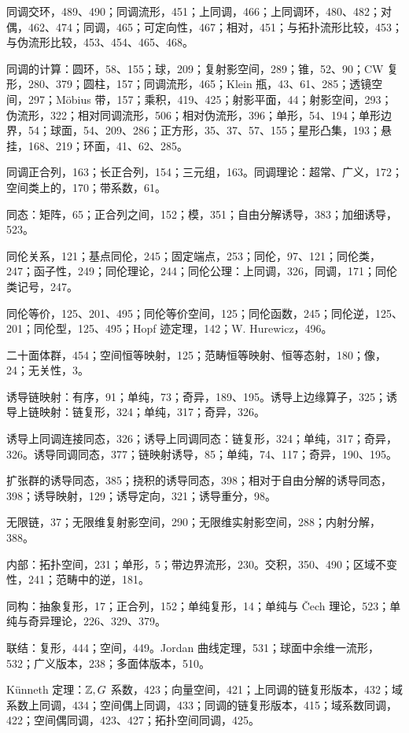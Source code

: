 同调交环，489、490；同调流形，451；上同调，466；上同调环，480、482；对偶，462、474；同调，465；可定向性，467；相对，451；与拓扑流形比较，453；与伪流形比较，453、454、465、468。

同调的计算：圆环，58、155；球，209；复射影空间，289；锥，52、90；CW 复形，280、379；圆柱，157；同调流形，465；Klein 瓶，43、61、285；透镜空间，297；Möbius 带，157；乘积，419、425；射影平面，44；射影空间，293；伪流形，322；相对同调流形，506；相对伪流形，396；单形，54、194；单形边界，54；球面，54、209、286；正方形，35、37、57、155；星形凸集，193；悬挂，168、219；环面，41、62、285。

同调正合列，163；长正合列，154；三元组，163。同调理论：超常、广义，172；空间类上的，170；带系数，61。

同态：矩阵，65；正合列之间，152；模，351；自由分解诱导，383；加细诱导，523。

同伦关系，121；基点同伦，245；固定端点，253；同伦，97、121；同伦类，247；函子性，249；同伦理论，244；同伦公理：上同调，326，同调，171；同伦类记号，247。

同伦等价，125、201、495；同伦等价空间，125；同伦函数，245；同伦逆，125、201；同伦型，125、495；Hopf 迹定理，142；W. Hurewicz，496。

二十面体群，454；空间恒等映射，125；范畴恒等映射、恒等态射，180；像，24；无关性，3。

诱导链映射：有序，91；单纯，73；奇异，189、195。诱导上边缘算子，325；诱导上链映射：链复形，324；单纯，317；奇异，326。

诱导上同调连接同态，326；诱导上同调同态：链复形，324；单纯，317；奇异，326。诱导同调同态，377；链映射诱导，85；单纯，74、117；奇异，190、195。

扩张群的诱导同态，385；挠积的诱导同态，398；相对于自由分解的诱导同态，398；诱导映射，129；诱导定向，321；诱导重分，98。

无限链，37；无限维复射影空间，290；无限维实射影空间，288；内射分解，388。

内部：拓扑空间，231；单形，5；带边界流形，230。交积，350、490；区域不变性，241；范畴中的逆，181。

同构：抽象复形，17；正合列，152；单纯复形，14；单纯与 Čech 理论，523；单纯与奇异理论，226、329、379。

联结：复形，444；空间，449。Jordan 曲线定理，531；球面中余维一流形，532；广义版本，238；多面体版本，510。

Künneth 定理：$\mathbb{Z},G$ 系数，423；向量空间，421；上同调的链复形版本，432；域系数上同调，434；空间偶上同调，433；同调的链复形版本，415；域系数同调，422；空间偶同调，423、427；拓扑空间同调，425。

